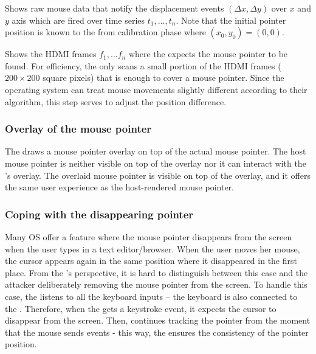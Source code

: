 \begin{mylist}
\item[]\one Shows raw mouse data that notify the displacement events $(\Delta x, \Delta y)$ over $x$ and $y$ axis which are fired over time series $t_1,\ldots, t_n$. Note that the initial pointer position is known to the \device from calibration phase where $(x_0, y_0) = (0, 0)$.  
\item[]\two Shows the HDMI frames $f_1,\ldots f_n$ where the \device expects the mouse pointer to be found. For efficiency, the \device only scans a small portion of the HDMI frames ($200 \times 200$ square pixels) that is enough to cover a mouse pointer. Since the operating system can treat mouse movements slightly different according to their algorithm, this step serves to adjust the position difference.
\end{mylist}


\subsubsection{\bfseries Overlay of the mouse pointer} The \device draws a mouse pointer overlay on top of the actual mouse pointer. The host mouse pointer is neither visible on top of the overlay nor it can interact with the \device's overlay. The overlaid mouse pointer is visible on top of the overlay, and it offers the same user experience as the host-rendered mouse pointer.


\subsubsection{\bfseries Coping with the disappearing pointer} Many OS offer a feature where the mouse pointer disappears from the screen when the user types in a text editor/browser. When the user moves her mouse, the cursor appears again in the same position where it disappeared in the first place. From the \device's perspective, it is hard to distinguish between this case and the attacker deliberately removing the mouse pointer from the screen. To handle this case, the \device listens to all the keyboard inputs -- the keyboard is also connected to the \device. Therefore, when the \device gets a keystroke event, it expects the cursor to disappear from the screen. Then, \device continues tracking the pointer from the moment that the mouse sends events  - this way, the \device ensures the consistency of the pointer position.  



